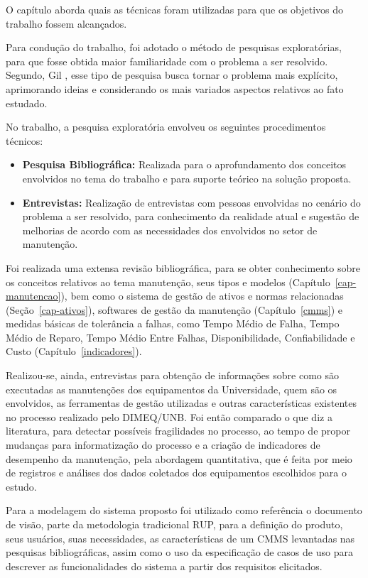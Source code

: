 O capítulo aborda quais as técnicas foram utilizadas para que os objetivos do trabalho fossem alcançados.

Para condução do trabalho, foi adotado o método de pesquisas exploratórias, para que fosse obtida maior familiaridade com o problema a ser resolvido. Segundo, Gil \cite{gil2002elaborar}, esse tipo de pesquisa busca tornar o problema mais explícito, aprimorando ideias e considerando os mais variados aspectos relativos ao fato estudado. 

No trabalho, a pesquisa exploratória envolveu os seguintes procedimentos técnicos:

\begin{itemize}
\item \textbf{Pesquisa Bibliográfica:} Realizada para o aprofundamento dos conceitos envolvidos no tema do trabalho e para suporte teórico na solução proposta.
\item \textbf{Entrevistas:} Realização de entrevistas com pessoas envolvidas no cenário do problema a ser resolvido, para conhecimento da realidade atual  e sugestão de melhorias de acordo com as necessidades dos envolvidos no setor de manutenção.
\end{itemize}

Foi realizada uma extensa revisão bibliográfica, para se obter conhecimento sobre os conceitos relativos ao tema manutenção, seus tipos e modelos (Capítulo~\ref{cap-manutencao}), bem como o sistema de gestão de ativos e normas relacionadas (Seção~\ref{cap-ativos}), softwares de gestão da manutenção (Capítulo~\ref{cmms}) e medidas básicas de tolerância a falhas, como  Tempo Médio de Falha, Tempo Médio de Reparo, Tempo Médio Entre Falhas, Disponibilidade, Confiabilidade e Custo (Capítulo~\ref{indicadores}).

Realizou-se, ainda, entrevistas para obtenção de informações sobre como são executadas as manutenções dos equipamentos da Universidade, quem são os envolvidos, as ferramentas de gestão utilizadas e outras características existentes no processo realizado pelo DIMEQ/UNB. Foi então comparado o que diz a literatura, para detectar possíveis fragilidades no processo, ao tempo de propor mudanças para informatização do processo e a criação de indicadores de desempenho da manutenção, pela abordagem quantitativa, que é feita por meio de registros e análises dos dados coletados dos equipamentos escolhidos para o estudo. 

Para a modelagem do sistema proposto foi utilizado como referência o documento de visão, parte da metodologia tradicional RUP, para a definição do produto, seus usuários, suas necessidades, as características de um CMMS levantadas nas pesquisas bibliográficas, assim como o uso da especificação de casos de uso para descrever as funcionalidades do sistema a partir dos requisitos elicitados.

